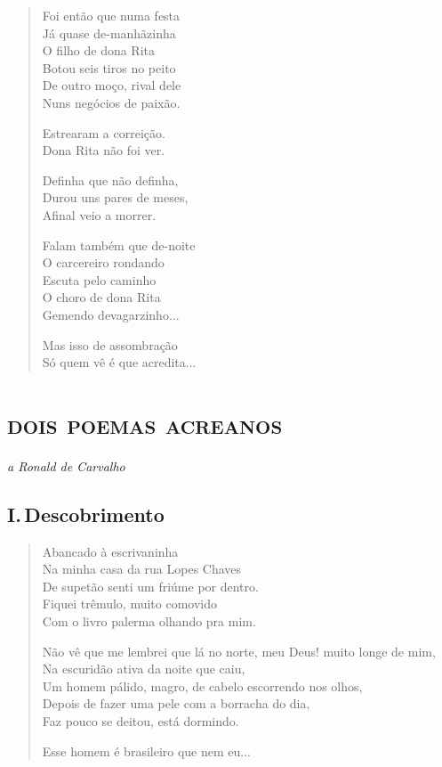 \begin{verse}
Foi então que numa festa\\
Já quase de-manhãzinha\\
O filho de dona Rita\\
Botou seis tiros no peito\\
De outro moço, rival dele\\
Nuns negócios de paixão.

Estrearam a correição.\\
Dona Rita não foi ver.

Definha que não definha,\\
Durou uns pares de meses,\\
Afinal veio a morrer.

Falam também que de-noite\\
O carcereiro rondando\\
Escuta pelo caminho\\
O choro de dona Rita\\
Gemendo devagarzinho...

Mas isso de assombração\\
Só quem vê é que acredita...
\end{verse}

\chapter[\textsc{dois poemas acreanos}\\I.\,Descobrimento]{\textsc{dois poemas acreanos}}

\begin{flushright}
\emph{a Ronald de Carvalho}
\end{flushright}

\section{I.\,Descobrimento}

\begin{verse}
Abancado à escrivaninha\\
Na minha casa da rua Lopes Chaves\\
De supetão senti um friúme por dentro.\\
Fiquei trêmulo, muito comovido\\
Com o livro palerma olhando pra mim.

Não vê que me lembrei que lá no norte, meu Deus! muito longe de mim,\\
Na escuridão ativa da noite que caiu,\\
Um homem pálido, magro, de cabelo escorrendo nos olhos,\\
Depois de fazer uma pele com a borracha do dia,\\
Faz pouco se deitou, está dormindo.

Esse homem é brasileiro que nem eu...
\end{verse}

